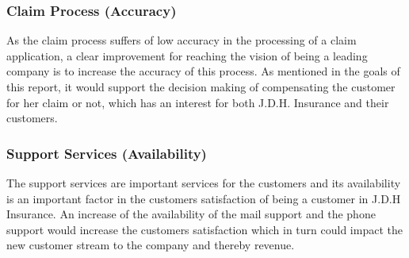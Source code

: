 \subsubsection{Claim Process (Accuracy)}
As the claim process suffers of low accuracy in the processing of a claim application, a clear improvement for reaching the vision of being a leading company is to increase the accuracy of this process. As mentioned in the goals of this report, it would support the decision making of compensating the customer for her claim or not, which has an interest for both J.D.H. Insurance and their customers.
\subsubsection{Support Services (Availability)}
The support services are important services for the customers and its availability is an important factor in the customers satisfaction of being a customer in J.D.H Insurance. An increase of the availability of the mail support and the phone support would increase the customers satisfaction which in turn could impact the new customer stream to the company and thereby revenue.